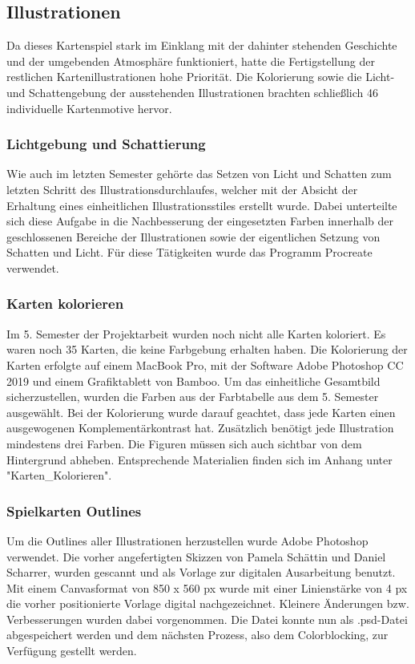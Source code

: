 \subsection{Illustrationen}
Da dieses Kartenspiel stark im Einklang mit der dahinter stehenden Geschichte und der umgebenden Atmosphäre funktioniert, hatte die Fertigstellung der restlichen Kartenillustrationen hohe Priorität. Die Kolorierung sowie die Licht- und Schattengebung der ausstehenden Illustrationen brachten schließlich 46 individuelle Kartenmotive hervor.

\subsubsection{Lichtgebung und Schattierung}
Wie auch im letzten Semester gehörte das Setzen von Licht und Schatten zum letzten Schritt des Illustrationsdurchlaufes, welcher mit der Absicht der Erhaltung eines einheitlichen Illustrationsstiles erstellt wurde. Dabei unterteilte sich diese Aufgabe in die Nachbesserung der eingesetzten Farben innerhalb der geschlossenen Bereiche der Illustrationen sowie der eigentlichen Setzung von Schatten und Licht. Für diese Tätigkeiten wurde das Programm Procreate verwendet.

\subsubsection{Karten kolorieren}
Im 5. Semester der Projektarbeit wurden noch nicht alle Karten koloriert. Es waren noch 35 Karten, die keine Farbgebung erhalten haben. Die Kolorierung der Karten erfolgte auf einem MacBook Pro, mit der Software Adobe Photoshop CC 2019 und einem Grafiktablett von Bamboo. Um das einheitliche Gesamtbild sicherzustellen, wurden die Farben aus der Farbtabelle aus dem 5. Semester ausgewählt. Bei der Kolorierung wurde darauf geachtet, dass jede Karten einen ausgewogenen Komplementärkontrast hat. Zusätzlich benötigt jede Illustration mindestens drei Farben. Die Figuren müssen sich auch sichtbar von dem Hintergrund abheben. 
Entsprechende Materialien finden sich im Anhang unter "Karten\_Kolorieren".

\subsubsection{Spielkarten Outlines}
Um die Outlines aller Illustrationen herzustellen wurde Adobe Photoshop verwendet. Die vorher angefertigten Skizzen von Pamela Schättin und Daniel Scharrer, wurden gescannt und als Vorlage zur digitalen Ausarbeitung benutzt. Mit einem Canvasformat von 850 x 560 px wurde mit einer Linienstärke von 4 px die vorher positionierte Vorlage digital nachgezeichnet. Kleinere Änderungen bzw. Verbesserungen wurden dabei vorgenommen. Die Datei konnte nun als .psd-Datei abgespeichert werden und dem nächsten Prozess, also dem Colorblocking, zur Verfügung gestellt werden.

